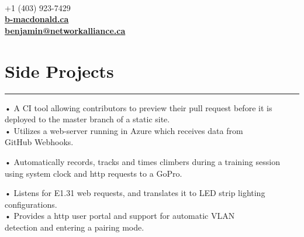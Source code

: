 \documentclass[]{resume}
\begin{document}
\begin{minipage}[t]{0.66\textwidth} 
\descript{}
\hspace*{0pt}\hfill    \\
\hspace*{0pt}\hfill    \\
\hspace*{0pt}\hfill    \\
\hspace*{0pt}\hfill +1 (403) 923-7429 \\
\hspace*{0pt}\hfill \textbf{\href{b-macdonald.ca}{b-macdonald.ca}} \\
\hspace*{0pt}\hfill \textbf{\href{mailto:benjamin@networkalliance.ca}{benjamin@networkalliance.ca}} \\
\section{Side Projects}
\noindent\rule{12.5cm}{0.4pt}
\noindent
\hspace{3em}%
\begin{minipage}{0.85\textwidth\vspace{5pt}}
• A CI tool allowing contributors to preview their pull request before it is deployed to the master branch of a static site.\\
• Utilizes a web-server running in Azure which receives data from\\GitHub Webhooks.
\end{minipage}
\noindent
\hspace{3em}%
\begin{minipage}{0.85\textwidth\vspace{5pt}}
• Automatically records, tracks and times climbers during a training session using system clock and http requests to a GoPro.
\end{minipage}
\noindent
\hspace{3em}%
\begin{minipage}{0.85\textwidth\vspace{5pt}}
• Listens for E1.31 web requests, and translates it to LED strip lighting configurations.\\
• Provides a http user portal and support for automatic VLAN\\detection and entering a pairing mode.
\end{minipage}

\end{minipage}
\end{document}
